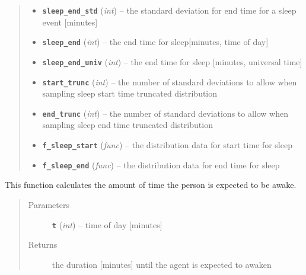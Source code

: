 \documentclass[letterpaper,10pt,english]{sphinxmanual}
\begin{document}
\begin{fulllineitems}
\begin{quote}
\begin{description}
\begin{itemize}
\item {} 
\textbf{\texttt{sleep\_end\_std}} (\emph{int}) -- the standard deviation for end time for a sleep event {[}minutes{]}

\item {} 
\textbf{\texttt{sleep\_end}} (\emph{int}) -- the end time for sleep{[}minutes, time of day{]}

\item {} 
\textbf{\texttt{sleep\_end\_univ}} (\emph{int}) -- the end time for sleep {[}minutes, universal time{]}

\item {} 
\textbf{\texttt{start\_trunc}} (\emph{int}) -- the number of standard deviations to allow when sampling sleep start time truncated     distribution

\item {} 
\textbf{\texttt{end\_trunc}} (\emph{int}) -- the number of standard deviations to allow when sampling sleep end time truncated     distribution

\item {} 
\textbf{\texttt{f\_sleep\_start}} (\emph{func}) -- the distribution data for start time for sleep

\item {} 
\textbf{\texttt{f\_sleep\_end}} (\emph{func}) -- the distribution data for end time for sleep

\end{itemize}

\end{description}\end{quote}

\begin{fulllineitems}
\label{bio:bio.Bio.calc_awake_duration}
This function calculates the amount of time the person is expected to be awake.
\begin{quote}\begin{description}
\item[{Parameters}] \leavevmode
\textbf{\texttt{t}} (\emph{int}) -- time of day {[}minutes{]}

\item[{Returns}] \leavevmode
the duration {[}minutes{]} until the agent is expected to awaken

\end{description}\end{quote}


\end{fulllineitems}
\end{fulllineitems}
\end{document}
